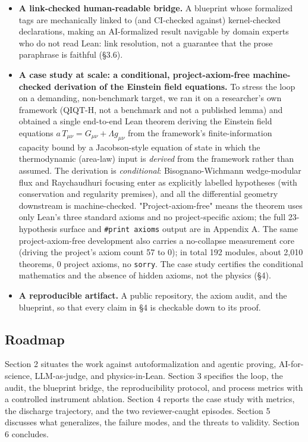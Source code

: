 \documentclass[11pt]{article}
\begin{document}
\begin{itemize}
  \item \textbf{A link-checked human-readable bridge.} A blueprint whose formalized tags are mechanically linked to (and CI-checked against) kernel-checked declarations, making an AI-formalized result navigable by domain experts who do not read Lean: link resolution, not a guarantee that the prose paraphrase is faithful (§3.6).
  \item \textbf{A case study at scale: a conditional, project-axiom-free machine-checked derivation of the Einstein field equations.} To stress the loop on a demanding, non-benchmark target, we ran it on a researcher's own framework (QIQT-H, not a benchmark and not a published lemma) and obtained a single end-to-end Lean theorem deriving the Einstein field equations $a\,T_{\mu\nu}=G_{\mu\nu}+\Lambda g_{\mu\nu}$ from the framework's finite-information capacity bound by a Jacobson-style equation of state in which the thermodynamic (area-law) input is \emph{derived} from the framework rather than assumed. The derivation is \emph{conditional}: Bisognano-Wichmann wedge-modular flux and Raychaudhuri focusing enter as explicitly labelled hypotheses (with conservation and regularity premises), and all the differential geometry downstream is machine-checked. "Project-axiom-free" means the theorem uses only Lean's three standard axioms and no project-specific axiom; the full 23-hypothesis surface and \texttt{\#print axioms} output are in Appendix A. The same project-axiom-free development also carries a no-collapse measurement core (driving the project's axiom count 57 to 0); in total 192 modules, about 2,010 theorems, 0 project axioms, no \texttt{sorry}. The case study certifies the conditional mathematics and the absence of hidden axioms, not the physics (§4).
  \item \textbf{A reproducible artifact.} A public repository, the axiom audit, and the blueprint, so that every claim in §4 is checkable down to its proof.
\end{itemize}

\subsection{Roadmap}

Section 2 situates the work against autoformalization and agentic proving, AI-for-science,
LLM-as-judge, and physics-in-Lean. Section 3 specifies the loop, the audit, the blueprint bridge,
the reproducibility protocol, and process metrics with a controlled instrument ablation. Section 4
reports the case study with metrics, the discharge
trajectory, and the two reviewer-caught episodes. Section 5 discusses what generalizes, the failure
modes, and the threats to validity. Section 6 concludes.
\end{document}
